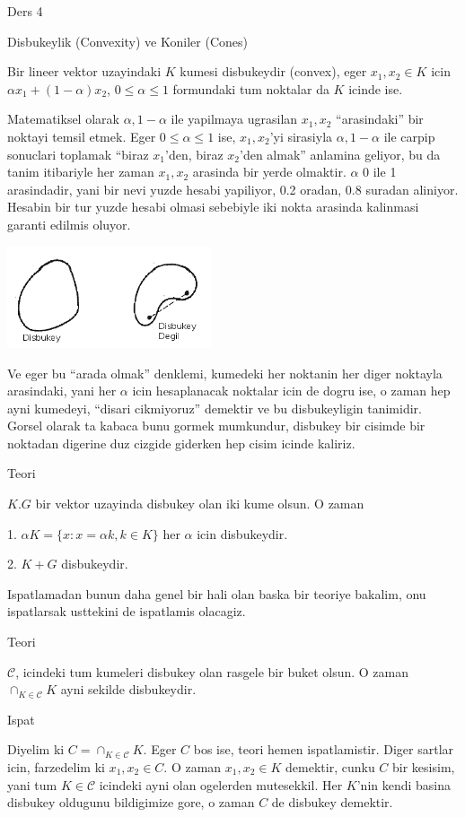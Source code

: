 \documentclass[12pt,fleqn]{article}
\begin{document}
Ders 4

Disbukeylik (Convexity) ve Koniler (Cones)

Bir lineer vektor uzayindaki $K$ kumesi disbukeydir (convex), eger 
$x_1,x_2
\in K$ icin $\alpha x_1 + (1-\alpha)x_2$, $0 \le \alpha \le 1$ formundaki
tum noktalar da $K$ icinde ise.

Matematiksel olarak $\alpha,1-\alpha$ ile yapilmaya ugrasilan $x_1,x_2$
``arasindaki'' bir noktayi temsil etmek. Eger $0 \le \alpha \le 1$ ise,
$x_1,x_2$'yi sirasiyla $\alpha,1-\alpha$ ile carpip sonuclari toplamak
``biraz $x_1$'den, biraz $x_2$'den almak'' anlamina geliyor, bu da tanim
itibariyle her zaman $x_1,x_2$ arasinda bir yerde olmaktir. $\alpha$ 0 ile
1 arasindadir, yani bir nevi yuzde hesabi yapiliyor, 0.2 oradan, 0.8
suradan aliniyor. Hesabin bir tur yuzde hesabi olmasi sebebiyle iki nokta
arasinda kalinmasi garanti edilmis oluyor. 

\includegraphics[height=3cm]{4_1.png}

Ve eger bu ``arada olmak'' denklemi, kumedeki her noktanin her diger
noktayla arasindaki, yani her $\alpha$ icin hesaplanacak noktalar icin de
dogru ise, o zaman hep ayni kumedeyi, ``disari cikmiyoruz'' demektir ve bu
disbukeyligin tanimidir. Gorsel olarak ta kabaca bunu gormek mumkundur,
disbukey bir cisimde bir noktadan digerine duz cizgide giderken hep cisim
icinde kaliriz.

Teori 

$K.G$ bir vektor uzayinda disbukey olan iki kume olsun. O zaman 

1. $\alpha K = \{x: x = \alpha k, k \in K\}$ her $\alpha$ icin disbukeydir. 

2. $K+G$ disbukeydir. 

Ispatlamadan bunun daha genel bir hali olan baska bir teoriye bakalim, onu
ispatlarsak usttekini de ispatlamis olacagiz. 

Teori 

$\mathscr{C}$, icindeki tum kumeleri disbukey olan rasgele bir buket
olsun. O zaman $\cap_{K \in \mathscr{C}}K$ ayni sekilde disbukeydir. 

Ispat

Diyelim ki $C = \cap_{K \in \mathscr{C}}K$. Eger $C$ bos ise, teori hemen
ispatlamistir. Diger sartlar icin, farzedelim ki $x_1,x_2 \in C$. O zaman
$x_1,x_2 \in K$ demektir, cunku $C$ bir kesisim, yani tum $K \in \mathscr{C}$
icindeki ayni olan ogelerden mutesekkil. Her $K$'nin kendi basina disbukey
oldugunu bildigimize gore, o zaman $C$ de disbukey demektir. 
\end{document}
